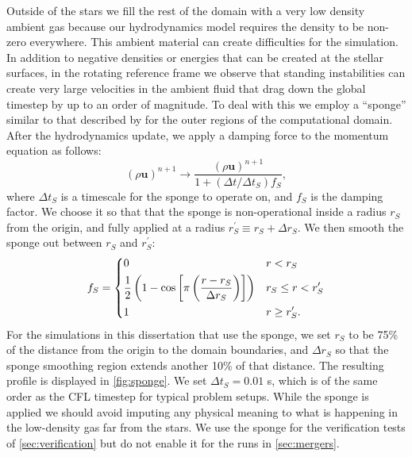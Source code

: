 \documentclass[12pt]{article}
\begin{document}
Outside of the stars we fill the rest of the domain with a very low density
ambient gas because our hydrodynamics model requires the density to be
non-zero everywhere. This ambient material can create difficulties for the simulation.
In addition to negative densities or energies that can be created at the stellar surfaces,
in the rotating reference frame we observe that standing instabilities can create very
large velocities in the ambient fluid that drag down the global timestep by
up to an order of magnitude.  To deal with this we employ a ``sponge'' similar
to that described by \citet{maestro3} for the outer regions of the computational domain.
After the hydrodynamics update, we apply a damping force to the momentum
equation as follows:
\begin{equation}
  (\rho \mathbf{u})^{n+1} \to \frac{(\rho \mathbf{u})^{n+1}}{1 + (\Delta t / \Delta t_S) f_S},
\end{equation}
where $\Delta t_S$ is a timescale for the sponge to operate on, and
$f_S$ is the damping factor.  We choose it so that that the sponge is
non-operational inside a radius $r_S$ from the origin, and fully
applied at a radius $r_S^\prime \equiv r_S + \Delta r_S$. We then
smooth the sponge out between $r_S$ and $r_S^\prime$:
\begin{equation}
  f_{S} = \begin{dcases} 0 & r < r_S \\ \frac{1}{2}\left(1 - \text{cos}\left[\pi\left(\dfrac{r - r_S}{\Delta r_S}\right)\right]\right) & r_S \leq r < r_S^\prime \\ 1 & r \geq r_S^\prime. \end{dcases}\label{eq:sponge_frac}
\end{equation}
For the simulations in this dissertation that use the sponge, we set $r_S$ to be 75\% of the
distance from the origin to the domain boundaries, and $\Delta r_S$ so
that the sponge smoothing region extends another 10\% of that distance.
The resulting profile is displayed in \autoref{fig:sponge}. We set $\Delta
t_S = 0.01$ s, which is of the same order as the CFL timestep
for typical problem setups. While the sponge is applied we should avoid imputing any physical
meaning to what is happening in the low-density gas far from the stars. We use the
sponge for the verification tests of \autoref{sec:verification} but do not enable it
for the runs in \autoref{sec:mergers}.
\end{document}
